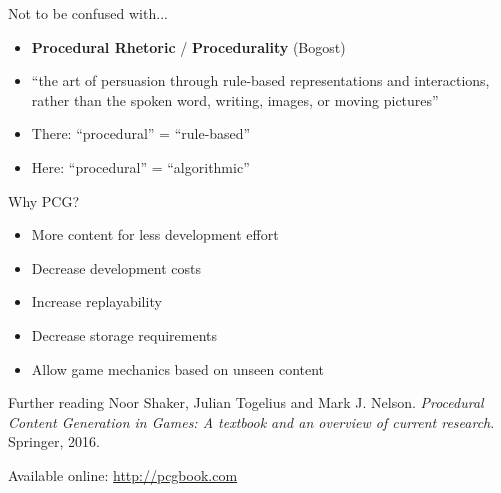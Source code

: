 \begin{frame}{Not to be confused with...}
	\begin{itemize}
		\pause\item \textbf{Procedural Rhetoric} / \textbf{Procedurality} (Bogost)
		\pause\item ``the art of persuasion through rule-based representations and interactions,
			rather than the spoken word, writing, images, or moving pictures''
		\pause\item There: ``procedural'' = ``rule-based''
		\pause\item Here: ``procedural'' = ``algorithmic''
	\end{itemize}
\end{frame}

\begin{frame}{Why PCG?}
	\begin{itemize}
		\pause\item More content for less development effort
		\pause\item Decrease development costs
		\pause\item Increase replayability
		\pause\item Decrease storage requirements
		\pause\item Allow game mechanics based on unseen content
	\end{itemize}
\end{frame}

\begin{frame}{Further reading}
	Noor Shaker, Julian Togelius and Mark J. Nelson.
	\textit{Procedural Content Generation in Games: A textbook and an overview of current research}.
	Springer, 2016.
	
	Available online: \url{http://pcgbook.com}
\end{frame}
